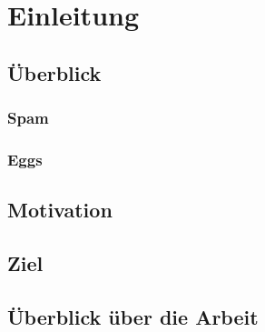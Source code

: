 \chapter{Einleitung}
\lipsum

\section{\"Uberblick}
\lipsum

\subsection{Spam}
\lipsum

\subsection{Eggs}
\lipsum

\section{Motivation}
\lipsum

\section{Ziel}
\lipsum

\section{Überblick über die Arbeit}
\lipsum